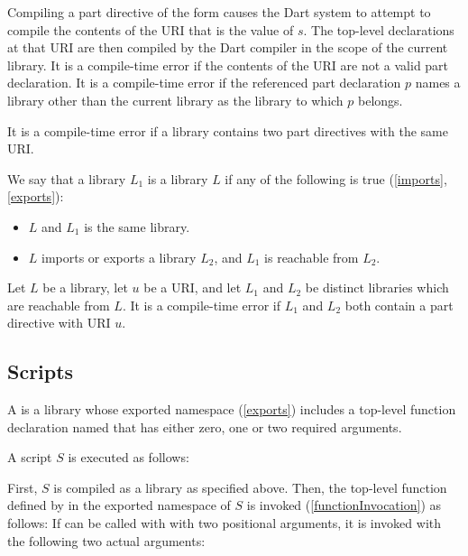 \documentclass[makeidx]{article}
\begin{document}
{\LMHash{}%
Compiling a part directive of the form 
causes the Dart system to attempt to compile the contents of
the URI that is the value of $s$.
The top-level declarations at that URI are then compiled by the Dart compiler
in the scope of the current library.
It is a compile-time error if the contents of the URI are not
a valid part declaration.
It is a compile-time error if the referenced part declaration $p$ names
a library other than the current library as the library to which $p$ belongs.

\LMHash{}%
It is a compile-time error if a library contains
two part directives with the same URI.

\LMHash{}%
We say that a library $L_1$ is  a library $L$ if
any of the following is true (\ref{imports}, \ref{exports}):

\begin{itemize}
\item $L$ and $L_1$ is the same library.
\item $L$ imports or exports a library $L_2$, and $L_1$ is reachable from $L_2$.
\end{itemize}

\LMHash{}%
Let $L$ be a library, let $u$ be a URI,
and let $L_1$ and $L_2$ be distinct libraries which are reachable from $L$.
It is a compile-time error if $L_1$ and $L_2$ both contain
a part directive with URI $u$.



\subsection{Scripts}

\LMHash{}%
A  is a library whose exported namespace (\ref{exports}) includes
a top-level function declaration named 
that has either zero, one or two required arguments.

A script $S$ is executed as follows:

\LMHash{}%
First, $S$ is compiled as a library as specified above.
Then, the top-level function defined by 
in the exported namespace of $S$ is invoked (\ref{functionInvocation})
as follows:
If  can be called with with two positional arguments,
it is invoked with the following two actual arguments:

}
\end{document}
